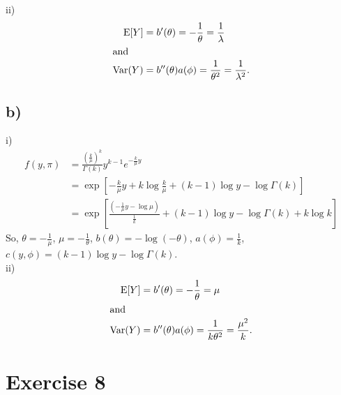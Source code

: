 \documentclass[a4paper]{article}
\newcommand{\E}{\mathrm{E}}
\newcommand{\Var}{\mathrm{Var}}
\begin{document}
ii)
\begin{align*}
\E[Y] &= b'(\theta) = -\frac{1}{\theta} = \frac{1}{\lambda}\\ \intertext{and}
\Var(Y) &= b''(\theta) a(\phi) = \frac{1}{\theta^{2}} = \frac{1}{\lambda^{2}}.
\end{align*}


\subsection{b)}
i)
\begin{align*}
f(y,\pi) &= \frac{\left(\frac{k}{\mu}\right)^{k}}{\Gamma(k)}y^{k-1}e^{-\frac{k}{\mu}y}\\
&= \exp\left[-\frac{k}{\mu}y +k\log\frac{k}{\mu} +(k-1)\log y -\log\Gamma(k)\right]\\
&= \exp\left[\frac{\left(-\frac{1}{\mu}y -\log\mu\right)}{\frac{1}{k}} +(k-1)\log y -\log\Gamma(k) +k\log k\right]
\end{align*}
So, $\theta = -\frac{1}{\mu}$, $\mu = -\frac{1}{\theta}$, $b(\theta) = -\log(-\theta)$, $a(\phi) = \frac{1}{k}$, $c(y,\phi) = (k-1)\log y -\log\Gamma(k)$.\\

ii)
\begin{align*}
\E[Y] &= b'(\theta) = -\frac{1}{\theta} = \mu\\ \intertext{and}
\Var(Y) &= b''(\theta) a(\phi) = \frac{1}{k\theta^{2}} = \frac{\mu^{2}}{k}.
\end{align*}


\vspace{\baselineskip}
\section{Exercise 8}
\end{document}
